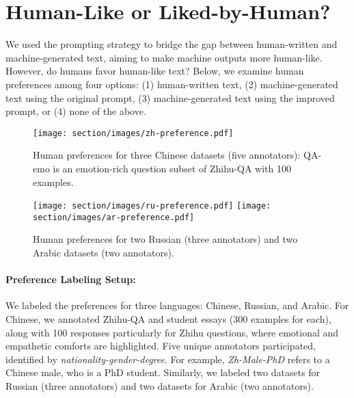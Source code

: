 \section{Human-Like or Liked-by-Human?}
We used the prompting strategy to bridge the gap between human-written and machine-generated text, aiming to make machine outputs more human-like. However, do humans favor human-like text? 
Below, we examine human preferences among four options: (1) human-written text, (2) machine-generated text using the original prompt, (3) machine-generated text using the improved prompt, or (4) none of the above. 


\begin{figure}[t!]
    \centering
    \texttt{[image: section/images/zh-preference.pdf]}
    \caption{Human preferences for three Chinese datasets (five annotators): QA-emo is an emotion-rich question subset of Zhihu-QA with 100 examples.}
    \label{fig:pre-zh}
\end{figure}


\begin{figure}[t!]
    \centering
    \texttt{[image: section/images/ru-preference.pdf]}
    \texttt{[image: section/images/ar-preference.pdf]}
    \caption{Human preferences for two Russian (three annotators) and two Arabic datasets (two annotators).}
    \label{fig:pre-ru-ar}
\end{figure}


\paragraph{Preference Labeling Setup:}
We labeled the preferences for three languages: Chinese, Russian, and Arabic.
For Chinese, we annotated Zhihu-QA and student essays (300 examples for each), along with 100 responses particularly for Zhihu questions, where emotional and empathetic comforts are highlighted. Five unique annotators participated, identified by \textit{nationality-gender-degree}. For example, \textit{Zh-Male-PhD} refers to a Chinese male, who is a PhD student.  
Similarly, we labeled two datasets for Russian (three annotators) and two datasets for Arabic (two annotators). 


